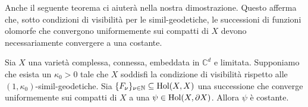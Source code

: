 Anche il seguente teorema ci aiuterà nella nostra dimostrazione. Questo afferma che, sotto condizioni di visibilità per le simil-geodetiche, le successioni di funzioni olomorfe che convergono uniformemente sui compatti di $X$ devono necessariamente convergere a una costante.

\begin{thm} \label{lim_is_const}
    Sia $X$ una varietà complessa, connessa, embeddata in $\mathbb{C}^d$ e limitata. Supponiamo che esista un $\kappa_0>0$ tale che $X$ soddisfi la condizione di visibilità rispetto alle $(1,\kappa_0)$-simil-geodetiche. Sia $\{F_\nu\}_{\nu\in\mathbb{N}} \subseteq \textnormal{Hol}(X,X)$  una successione che converge uniformemente sui compatti di $X$ a una $\psi\in\textnormal{Hol}(X,\partial X)$. Allora $\psi$ è costante.
\end{thm}

